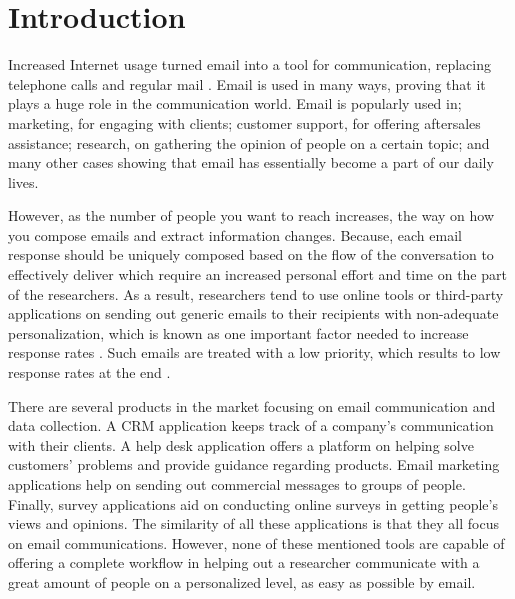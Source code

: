 \clearemptydoublepage
{}

\chapter{Introduction}
\label{chp:Intro}
Increased Internet usage turned email into a tool for communication, replacing telephone calls and regular mail \citep{Norman2000,Madden2003}. Email is used in many ways, proving that it plays a huge role in the communication world. Email is popularly used in; marketing, for engaging with clients; customer support, for offering aftersales assistance; research, on gathering the opinion of people on a certain topic; and many other cases showing that email has essentially become a part of our daily lives.
\vspace{1cm}

However, as the number of people you want to reach increases, the way on how you compose emails and extract information changes. Because, each email response should be uniquely composed based on the flow of the conversation to effectively deliver which require an increased personal effort and time on the part of the researchers. As a result, researchers tend to use online tools or third-party applications on sending out generic emails to their recipients with non-adequate personalization, which is known as one important factor needed to increase response rates \citep{Dillman1991,Schaefer1998}. Such emails are treated with a low priority, which results to low response rates at the end \citep[page 272]{DillmanDonA.SmythJoleneD.Christian2009}.
\vspace{1cm}

There are several products in the market focusing on email communication and data collection. A \ac{CRM} application keeps track of a company's communication with their clients. A help desk application offers a platform on helping solve customers' problems and provide guidance regarding products. Email marketing applications help on sending out commercial messages to groups of people. Finally, survey applications aid on conducting online surveys in getting people's views and opinions. The similarity of all these applications is that they all focus on email communications. However, none of these mentioned tools are capable of offering a complete workflow in helping out a researcher communicate with a great amount of people on a personalized level, as easy as possible by email.
\vspace{1cm}

